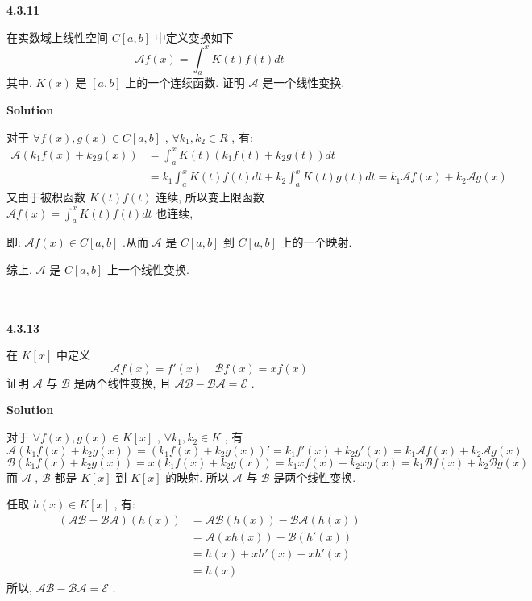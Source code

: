 \documentclass[11pt,a4paper,openany,oneside]{book}
\newcommand\Solution{\noindent\textbf{\textsf{Solution}}\par\medskip}
\begin{document}
\begin{myexample}
	\textbf{4.3.11}

在实数域上线性空间 $ C[a,b] $ 中定义变换如下
 $$  \mathcal{A}f(x) = \int_{a}^xK(t)f(t)dt  $$ 
其中,  $ K(x) $ 是 $ [a,b] $ 上的一个连续函数. 证明 $ \mathcal{A} $ 是一个线性变换. \\

\end{myexample}
\Solution  

对于 $ \forall f(x), g(x) \in C[a,b] $ ,  $ \forall k_1, k_2 \in R $ , 有:
\begin{align*}
\mathcal{A}(k_1f(x) + k_2g(x)) &= \int_a^x K(t)(k_1f(t) + k_2g(t))dt\\
&= k_1\int_a^xK(t)f(t)dt + k_2\int_a^xK(t)g(t)dt = k_1\mathcal{A}f(x) + k_2\mathcal{A}g(x)
\end{align*}
又由于被积函数 $ K(t)f(t) $ 连续, 所以变上限函数 $ \mathcal{A}f(x) = \int_a^xK(t)f(t)dt $ 也连续, 

即: $ \mathcal{A}f(x) \in C[a,b] $ .从而 $ \mathcal{A} $ 是 $ C[a,b] $ 到 $ C[a,b] $ 上的一个映射.

综上,  $ \mathcal{A} $ 是 $ C[a,b] $ 上一个线性变换. \\  \\  \\





\begin{myexample}
	\textbf{4.3.13}

在 $ K[x] $ 中定义
 $$  \mathcal{A}f(x) = f'(x) \ \ \ \ \ \mathcal{B} f(x)= xf(x)  $$ 
证明 $ \mathcal{A} $ 与 $ \mathcal{B} $ 是两个线性变换, 且 $ \mathcal{A}\mathcal{B} - \mathcal{B}\mathcal{A} = \mathcal{E} $ . \\

\end{myexample}
\Solution  

对于 $ \forall f(x), g(x) \in K[x] $ ,  $ \forall k_1, k_2 \in K $ , 有
 $$  \mathcal{A}(k_1f(x) + k_2g(x)) =(k_1f(x) + k_2g(x))' =  k_1f'(x) + k_2g'(x) = k_1\mathcal{A}f(x) + k_2\mathcal{A}g(x)  $$ 
 $$  \mathcal{B}(k_1f(x) + k_2g(x)) =x(k_1f(x) + k_2g(x)) = k_1xf(x) + k_2xg(x) = k_1\mathcal{B}f(x) + k_2\mathcal{B}g(x)  $$ 
而 $ \mathcal{A} $ ,  $ \mathcal{B} $ 都是 $ K[x] $ 到 $ K[x] $ 的映射. 
所以 $ \mathcal{A} $ 与 $ \mathcal{B} $ 是两个线性变换. 

任取 $ h(x) \in K[x] $ , 有:
\begin{align*}
(\mathcal{AB} - \mathcal{BA})(h(x)) &= \mathcal{A}\mathcal{B}(h(x)) - \mathcal{B}\mathcal{A}(h(x)) \\
&= \mathcal{A}(xh(x)) - \mathcal{B}(h'(x))  \\
&=h(x) + xh'(x) - xh'(x) \\
&=h(x)
\end{align*}
所以,  $ \mathcal{A}\mathcal{B} - \mathcal{B}\mathcal{A} = \mathcal{E} $ .  \\  \\  \\
\end{document}
